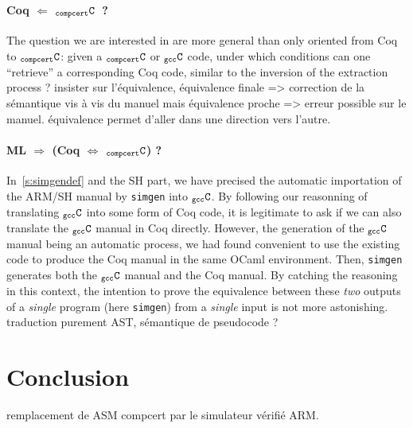 \documentclass[a4paper, 11pt]{article}
\newcommand{\simgen}{{\tt simgen}\xspace}
\newcommand{\C}{$_{\tt compcert}{\tt C}$\xspace}
\newcommand{\gccC}{$_{\tt gcc}{\tt C}$\xspace}
\begin{document}
\paragraph{Coq $\Longleftarrow$ \C~?}
The question we are interested in are more general than only oriented from Coq to \C : given a \C or \gccC code, under which conditions can one ``retrieve'' a corresponding Coq code, similar to the inversion of the extraction process ?
insister sur l'équivalence, équivalence finale => correction de la sémantique vis à vis du manuel mais équivalence proche => erreur possible sur le manuel. équivalence permet d'aller dans une direction vers l'autre.

\paragraph{ML $\Longrightarrow$ (Coq $\Longleftrightarrow$ \C) ?}

In~\ref{s:simgendef} and the SH part, we have precised the automatic importation of the ARM/SH manual by \simgen into \gccC. By following our reasonning of translating \gccC into some form of Coq code, it is legitimate to ask if we can also translate the \gccC manual in Coq directly. However, the generation of the \gccC manual being an automatic process, we had found convenient to use the existing code to produce the Coq manual in the same OCaml environment. Then, \simgen generates both the \gccC manual and the Coq manual. By catching the reasoning in this context, the intention to prove the equivalence between these \emph{two} outputs of a \emph{single} program (here \simgen) from a \emph{single} input is not more astonishing.
traduction purement AST, sémantique de pseudocode ?

\section{Conclusion}
\label{s:concl}
remplacement de ASM compcert par le simulateur vérifié ARM.



\end{document}
